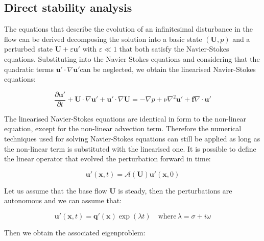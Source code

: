 \subsection{Direct stability analysis}


The equations that describe the evolution of an infinitesimal disturbance in the flow can be derived decomposing the solution into a basic state $(\mathbf{U}, p)$ and a perturbed state  $\mathbf{U}+\varepsilon \mathbf{u'}$ with $\varepsilon \ll 1$ that both satisfy the Navier-Stokes equations. Substituting into the Navier Stokes equations and considering that the quadratic terms $\mathbf{u'} \cdot \nabla \mathbf{u'}$can be neglected, we obtain the linearised Navier-Stokes equations:

\begin{subequations}
\begin{equation}
  \frac{\partial \mathbf{u'}}{\partial t} + \mathbf{U} \cdot  \nabla \mathbf{u'}+\mathbf{u'} \cdot \nabla \mathbf{U} = -\nabla p + \nu \nabla^2 \mathbf{u'} + \mathbf{f}
\end{equation}

\begin{equation}
\nabla \cdot \mathbf{u'}
\end{equation}

\end{subequations}



The linearised Navier-Stokes equations are identical in form to the non-linear equation, except for the non-linear advection term. Therefore the numerical techniques used for solving Navier-Stokes equations can still be applied as long as the non-linear term is substituted with the linearised one. It is possible to define the linear operator that evolved the perturbation forward in time:

\begin{equation}
   \mathbf{u'}(\mathbf{x},t)=\mathcal{A}(\mathbf{U})\mathbf{u'}(\mathbf{x},0)
\end{equation}

Let us assume that the base flow  $\mathbf{U}$ is steady, then the perturbations are autonomous and we can assume that:

\begin{equation}
   \mathbf{u'}(\mathbf{x},t)=\mathbf{q'}(\mathbf{x})\exp(\lambda t) \quad \mbox{where} \, \lambda=\sigma+i \omega
\end{equation}

Then we obtain the associated eigenproblem:

